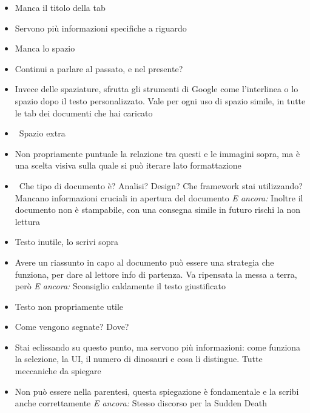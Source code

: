 {\small
\begin{itemize}
  \item {} Manca il titolo della tab
  \item {} Servono più informazioni specifiche a riguardo
  \item {} Manca lo spazio
  \item {} Continui a parlare al passato, e nel presente?
  \item {} Invece delle spaziature, sfrutta gli strumenti di Google come l'interlinea o lo spazio dopo il testo personalizzato. Vale per ogni uso di spazio simile, in tutte le tab dei documenti che hai caricato
  \item \rvVuoto\ Spazio extra
  \item {} Non propriamente puntuale la relazione tra questi e le immagini sopra, ma è una scelta visiva sulla quale si può iterare lato formattazione
  \item {} \rvAvviso\ Che tipo di documento è? Analisi? Design? Che framework stai utilizzando? Mancano informazioni cruciali in apertura del documento \emph{E ancora:} Inoltre il documento non è stampabile, con una consegna simile in futuro rischi la non lettura
  \item {} Testo inutile, lo scrivi sopra
  \item {} Avere un riassunto in capo al documento può essere una strategia che funziona, per dare al lettore info di partenza. Va ripensata la messa a terra, però \emph{E ancora:} Sconsiglio caldamente il testo giustificato
  \item {} Testo non propriamente utile
  \item {} Come vengono segnate? Dove?
  \item {} Stai eclissando su questo punto, ma servono più informazioni: come funziona la selezione, la UI, il numero di dinosauri e cosa li distingue. Tutte meccaniche da spiegare
  \item {} Non può essere nella parentesi, questa spiegazione è fondamentale e la scribi anche correttamente \emph{E ancora:} Stesso discorso per la Sudden Death

\end{itemize}}

